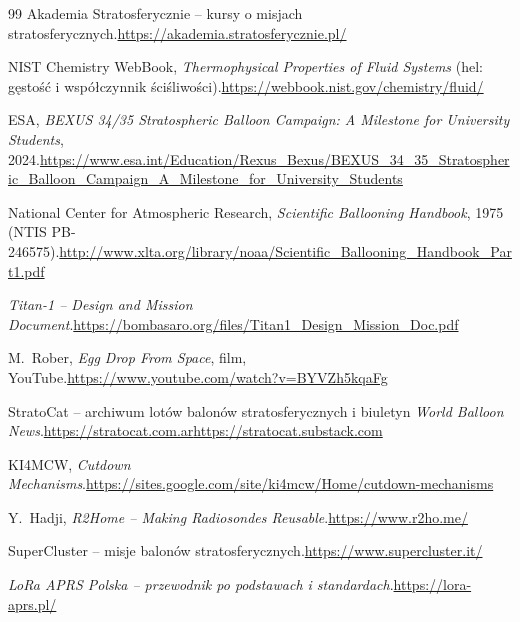 \begin{thebibliography}{99}
 Akademia Stratosferycznie -- kursy o misjach stratosferycznych.\newline\url{https://akademia.stratosferycznie.pl/}

 NIST Chemistry WebBook, \emph{Thermophysical Properties of Fluid Systems} (hel: gęstość i współczynnik ściśliwości).\newline\url{https://webbook.nist.gov/chemistry/fluid/}

 ESA, \emph{BEXUS 34/35 Stratospheric Balloon Campaign: A Milestone for University Students}, 2024.\newline\url{https://www.esa.int/Education/Rexus_Bexus/BEXUS_34_35_Stratospheric_Balloon_Campaign_A_Milestone_for_University_Students}

 National Center for Atmospheric Research, \emph{Scientific Ballooning Handbook}, 1975 (NTIS PB-246575).\newline\url{http://www.xlta.org/library/noaa/Scientific_Ballooning_Handbook_Part1.pdf}

 \emph{Titan-1 -- Design and Mission Document}.\newline\url{https://bombasaro.org/files/Titan1_Design_Mission_Doc.pdf}

 M.~Rober, \emph{Egg Drop From Space}, film, YouTube.\newline\url{https://www.youtube.com/watch?v=BYVZh5kqaFg}

 StratoCat -- archiwum lotów balonów stratosferycznych i biuletyn \emph{World Balloon News}.\newline\url{https://stratocat.com.ar}\newline\url{https://stratocat.substack.com}

 KI4MCW, \emph{Cutdown Mechanisms}.\newline\url{https://sites.google.com/site/ki4mcw/Home/cutdown-mechanisms}

 Y.~Hadji, \emph{R2Home -- Making Radiosondes Reusable}.\newline\url{https://www.r2ho.me/}

 SuperCluster -- misje balonów stratosferycznych.\newline\url{https://www.supercluster.it/}

 \emph{LoRa APRS Polska -- przewodnik po podstawach i standardach}.\newline\url{https://lora-aprs.pl/}


\end{thebibliography}
